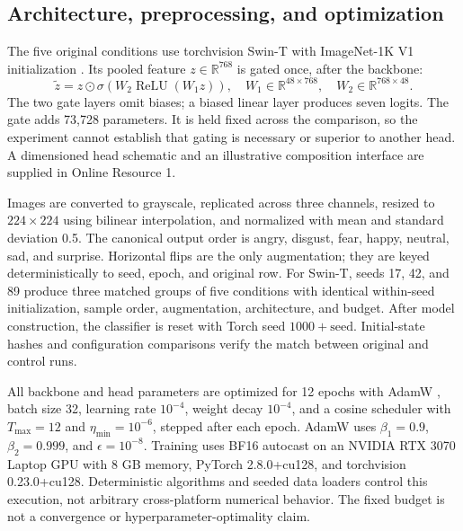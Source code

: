 \documentclass[pdflatex,sn-mathphys-num]{sn-jnl}
\begin{document}
\subsection{Architecture, preprocessing, and optimization}
The five original conditions use torchvision Swin-T with ImageNet-1K V1 initialization \cite{liu2021swin,deng2009imagenet,paszke2019pytorch}. Its pooled feature $z\in\mathbb{R}^{768}$ is gated once, after the backbone:
\begin{equation}
\tilde z=z\odot\sigma\!\left(W_2\operatorname{ReLU}(W_1z)\right),
\quad W_1\in\mathbb{R}^{48\times768},\quad W_2\in\mathbb{R}^{768\times48}.
\end{equation}
The two gate layers omit biases; a biased linear layer produces seven logits. The gate adds 73,728 parameters. It is held fixed across the comparison, so the experiment cannot establish that gating is necessary or superior to another head.
A dimensioned head schematic and an illustrative composition interface are supplied in Online Resource 1.

Images are converted to grayscale, replicated across three channels, resized to $224\times224$ using bilinear interpolation, and normalized with mean and standard deviation 0.5. The canonical output order is angry, disgust, fear, happy, neutral, sad, and surprise. Horizontal flips are the only augmentation; they are keyed deterministically to seed, epoch, and original row. For Swin-T, seeds 17, 42, and 89 produce three matched groups of five conditions with identical within-seed initialization, sample order, augmentation, architecture, and budget. After model construction, the classifier is reset with Torch seed $1000+\mathrm{seed}$. Initial-state hashes and configuration comparisons verify the match between original and control runs.

All backbone and head parameters are optimized for 12 epochs with AdamW \cite{loshchilov2019adamw}, batch size 32, learning rate $10^{-4}$, weight decay $10^{-4}$, and a cosine scheduler with $T_{\max}=12$ and $\eta_{\min}=10^{-6}$, stepped after each epoch. AdamW uses $\beta_1=0.9$, $\beta_2=0.999$, and $\epsilon=10^{-8}$. Training uses BF16 autocast on an NVIDIA RTX 3070 Laptop GPU with 8 GB memory, PyTorch 2.8.0+cu128, and torchvision 0.23.0+cu128. Deterministic algorithms and seeded data loaders control this execution, not arbitrary cross-platform numerical behavior. The fixed budget is not a convergence or hyperparameter-optimality claim.
\end{document}
